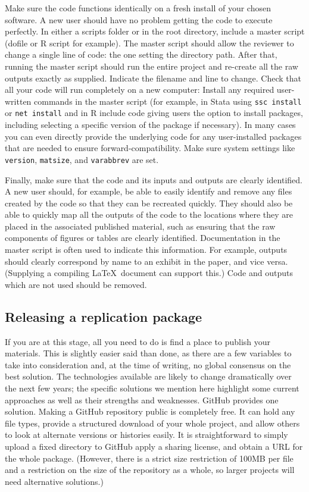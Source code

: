 Make sure the code functions identically on a fresh install of your chosen software.
A new user should have no problem getting the code to execute perfectly.
In either a scripts folder or in the root directory,
include a master script (dofile or R script for example).
The master script should allow the reviewer
to change a single line of code: the one setting the directory path.
After that, running the master script should run the entire project
and re-create all the raw outputs exactly as supplied.
Indicate the filename and line to change.
Check that all your code will run completely on a new computer:
Install any required user-written commands in the master script
(for example, in Stata using \texttt{ssc install} or \texttt{net install}
and in R include code giving users the option to install packages,
including selecting a specific version of the package if necessary).
In many cases you can even directly provide the underlying code
for any user-installed packages that are needed to ensure forward-compatibility.
Make sure system settings like \texttt{version}, \texttt{matsize}, and \texttt{varabbrev} are set.

Finally, make sure that the code and its inputs and outputs are clearly identified.
A new user should, for example, be able to easily identify and remove
any files created by the code so that they can be recreated quickly.
They should also be able to quickly map all the outputs of the code
to the locations where they are placed in the associated published material,
such as ensuring that the raw components of figures or tables are clearly identified.
Documentation in the master script is often used to indicate this information.
For example, outputs should clearly correspond by name to an exhibit in the paper, and vice versa.
(Supplying a compiling \LaTeX\ document can support this.)
Code and outputs which are not used should be removed.

\subsection{Releasing a replication package}

If you are at this stage,
all you need to do is find a place to publish your materials.
This is slightly easier said than done,
as there are a few variables to take into consideration
and, at the time of writing, no global consensus on the best solution.
The technologies available are likely to change dramatically
over the next few years;
the specific solutions we mention here highlight some current approaches
as well as their strengths and weaknesses.
GitHub provides one solution.
Making a GitHub repository public is completely free.
It can hold any file types,
provide a structured download of your whole project,
and allow others to look at alternate versions or histories easily.
It is straightforward to simply upload a fixed directory to GitHub
apply a sharing license, and obtain a URL for the whole package.
(However, there is a strict size restriction of 100MB per file and
a restriction on the size of the repository as a whole,
so larger projects will need alternative solutions.)

